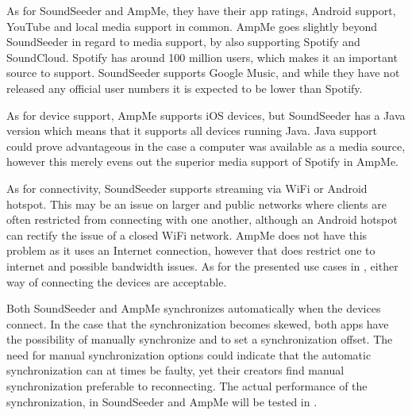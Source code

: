 As for SoundSeeder and AmpMe, they have their app ratings, Android support, YouTube and local media support in common.
AmpMe goes slightly beyond SoundSeeder in regard to media support, by also supporting Spotify and SoundCloud.
Spotify has around 100 million users, which makes it an important source to support\cite{spotify_subscribers}.
SoundSeeder supports Google Music, and while they have not released any official user numbers it is expected to be lower than Spotify\cite{googlem_subscribers}.

As for device support, AmpMe supports iOS devices, but SoundSeeder has a Java version which means that it supports all devices running Java. 
Java support could prove advantageous in the case a computer was available as a media source, however this merely evens out the superior media support of Spotify in AmpMe.

As for connectivity, SoundSeeder supports streaming via WiFi or Android hotspot.
This may be an issue on larger and public networks where clients are often restricted from connecting with one another, although an Android hotspot can rectify the issue of a closed WiFi network.
AmpMe does not have this problem as it uses an Internet connection, however that does restrict one to internet and possible bandwidth issues.
As for the presented use cases in , either way of connecting the devices are acceptable.

Both SoundSeeder and AmpMe synchronizes automatically when the devices connect.
In the case that the synchronization becomes skewed, both apps have the possibility of manually synchronize and to set a synchronization offset.
The need for manual synchronization options could indicate that the automatic synchronization can at times be faulty, yet their creators find manual synchronization preferable to reconnecting.
The actual performance of the synchronization, in SoundSeeder and AmpMe will be tested in .

